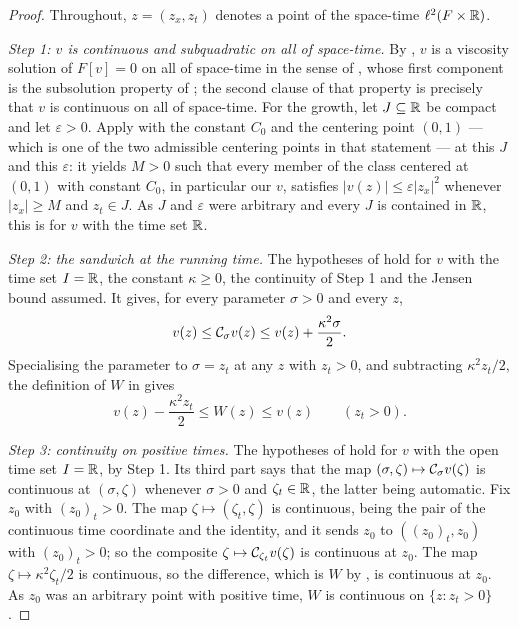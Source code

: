 \begin{proof}
Throughout, $z=(z_x,z_t)$ denotes a point of the space-time $\ell^2(F\times\mathbb{R})$.

\emph{Step 1: $v$ is continuous and subquadratic on all of space-time.}
By , $v$ is a viscosity solution of $F[v]=0$ on all of space-time in
the sense of , whose first component is the subsolution
property of ; the second clause of that property is precisely that
$v$ is continuous on all of space-time. For the growth, let $J\subseteq\mathbb{R}$ be compact and
let $\varepsilon>0$. Apply  with the constant $C_0$ and the
centering point $(0,1)$ --- which is one of the two admissible centering points in that
statement --- at this $J$ and this $\varepsilon$: it yields $M>0$ such that every member
of the class centered at $(0,1)$ with constant $C_0$, in particular our $v$, satisfies
$|v(z)|\le\varepsilon|z_x|^2$ whenever $|z_x|\ge M$ and $z_t\in J$. As $J$ and
$\varepsilon$ were arbitrary and every $J$ is contained in $\mathbb{R}$, this is
 for $v$ with the time set $\mathbb{R}$.

\emph{Step 2: the sandwich at the running time.}
The hypotheses of  hold for $v$ with the time set $I=\mathbb{R}$, the
constant $\kappa\ge0$, the continuity of Step 1 and the Jensen bound assumed. It gives,
for every parameter $\sigma>0$ and every $z$,
\[
  v(z)\le\mathcal{C}_\sigma v(z)\le v(z)+\frac{\kappa^2\sigma}{2}.
\]
Specialising the parameter to $\sigma=z_t$ at any $z$ with $z_t>0$, and subtracting
$\kappa^2z_t/2$, the definition of $W$ in  gives
\begin{equation}\label{eq:cept-sandwich}
  v(z)-\frac{\kappa^2z_t}{2}\le W(z)\le v(z)\qquad(z_t>0).
\end{equation}

\emph{Step 3: continuity on positive times.}
The hypotheses of  hold for $v$ with the open time set $I=\mathbb{R}$, by
Step 1. Its third part says that the map $(\sigma,\zeta)\mapsto\mathcal{C}_\sigma v(\zeta)$ is
continuous at $(\sigma,\zeta)$ whenever $\sigma>0$ and $\zeta_t\in\mathbb{R}$, the latter being
automatic. Fix $z_0$ with $(z_0)_t>0$. The map $\zeta\mapsto(\zeta_t,\zeta)$ is
continuous, being the pair of the continuous time coordinate and the identity, and it
sends $z_0$ to $((z_0)_t,z_0)$ with $(z_0)_t>0$; so the composite
$\zeta\mapsto\mathcal{C}_{\zeta_t}v(\zeta)$ is continuous at $z_0$. The map
$\zeta\mapsto\kappa^2\zeta_t/2$ is continuous, so the difference, which is $W$ by
, is continuous at $z_0$. As $z_0$ was an arbitrary point with
positive time, $W$ is continuous on $\{z:z_t>0\}$.


\end{proof}
